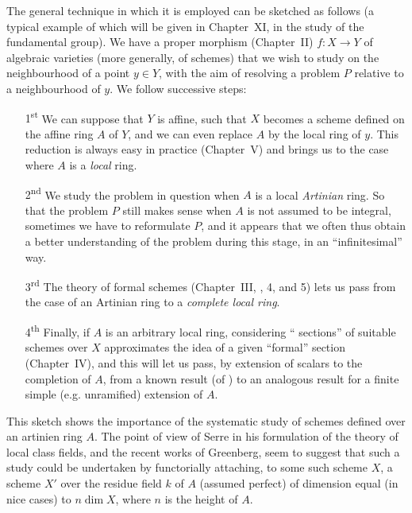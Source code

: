 \documentclass[10pt,oneside]{book}
\begin{document}
The general technique in which it is employed can be sketched as follows (a
typical example of which will be given in Chapter~XI, in the study of the
fundamental group). We have a proper morphism (Chapter~II) $f:X\to Y$ of
algebraic varieties (more generally, of schemes) that we wish to study on the
neighbourhood of a point $y\in Y$, with the aim of resolving a problem $P$
relative to a neighbourhood of $y$. We follow successive steps:
\begin{itemize}
  \item[1\textsuperscript{st}]
     We can suppose that $Y$ is affine, such that $X$ becomes a scheme
     defined on the affine ring $A$ of $Y$, and we can even replace $A$
     by the local ring of $y$. This reduction is always easy in practice
     (Chapter~V) and brings us to the case where $A$ is a \emph{local} ring.
  \item[2\textsuperscript{nd}]
     We study the problem in question when $A$ is a local \emph{Artinian}
     ring. So that the problem $P$ still makes sense when $A$ is not
     assumed to be integral, sometimes we have to reformulate $P$, and it
     appears that we often thus obtain a better understanding of the problem
     during this stage, in an ``infinitesimal'' way.
  \item[3\textsuperscript{rd}]
     The theory of formal schemes (Chapter~III, \textsection{}, 4, and 5)
     lets us pass from the case of an Artinian ring to a \emph{complete local ring}.
  \item[4\textsuperscript{th}]
     Finally, if $A$ is an arbitrary local ring, considering
     `` sections'' of suitable schemes over $X$
     approximates the idea of a given ``formal'' section (Chapter~IV), and
     this will let us pass,
     by extension of scalars to the completion of $A$, from a known result (of
     \completelyunsure) to an
     analogous result for a finite simple (e.g. unramified) extension of $A$.
\end{itemize}

This sketch shows the importance of the systematic study of schemes defined over
an artinien ring $A$. The point of view of Serre in his formulation of the
theory of local class fields, and the recent works of Greenberg, seem
to suggest that such a study could be undertaken by functorially attaching, to
some such scheme $X$, a scheme $X'$ over the residue field $k$ of $A$ (assumed
perfect) of dimension equal (in nice cases) to $n\dim X$, where $n$ is
the height of $A$.
\end{document}
